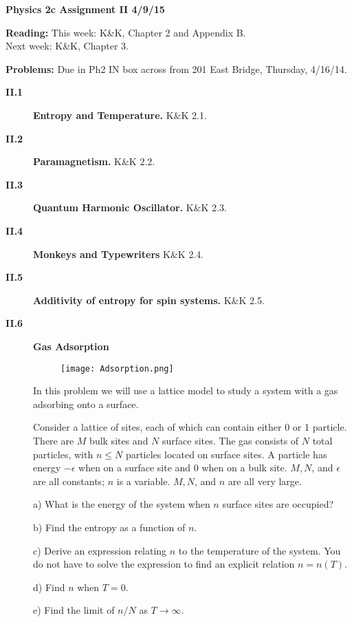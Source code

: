 \documentclass[11pt]{article}
\begin{document}
%
\centerline{\large\bf Physics 2c \hfill Assignment II \hfill  4/9/15}

\medskip
\begin{list}{}{\leftmargin 2.4cm  .2cm }
\item[{\bf Reading:}  \hfill ] This week: K\&K, Chapter 2 and Appendix B. \\
                               Next week: K\&K, Chapter 3.
\item[{\bf Problems:} \hfill ] Due in Ph2 IN box across from 201 East Bridge, Thursday, 4/16/14.
\end{list}

\begin{description}

\item[{\bf II.1} ] {\bf Entropy and Temperature.} K\&K 2.1.

\item[{\bf II.2} ] {\bf Paramagnetism.} K\&K 2.2.

\item[{\bf II.3} ] {\bf Quantum Harmonic Oscillator.} K\&K 2.3.

\item[{\bf II.4} ] {\bf Monkeys and Typewriters} K\&K 2.4.

\item[{\bf II.5} ] {\bf Additivity of entropy for spin systems.} K\&K 2.5.

\item[{\bf II.6} ] {\bf Gas Adsorption}
\begin{figure}[h!]
\centering
\texttt{[image: Adsorption.png]}
\end{figure}

In this problem we will use a lattice model to study a system with a gas adsorbing onto a surface.

Consider a lattice of sites, each of which can contain either 0 or 1 particle. 
There are $M$ bulk sites and $N$ surface sites. The gas consists of $N$ total particles, 
with $n \leq N$ particles located on surface sites. A particle has energy $-\epsilon$ when 
on a surface site and $0$ when on a bulk site. $M, N$, and $\epsilon$ are all constants; $n$ is a
variable. $M, N$, and $n$ are all very large.

a) What is the energy of the system when $n$ surface sites are occupied?

b) Find the entropy as a function of $n$.

c) Derive an expression relating $n$ to the temperature of the system. You do not 
have to solve the expression to find an explicit relation $n = n(T)$.

d) Find $n$ when $T = 0$.

e) Find the limit of $n/N$ as $T \rightarrow \infty$.

\end{description}
\end{document}
